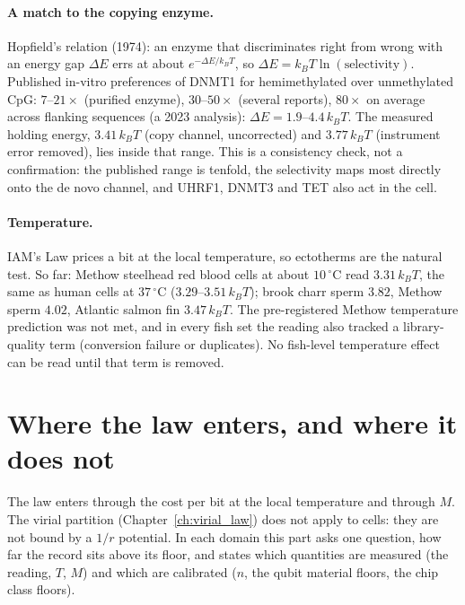 \paragraph{A match to the copying enzyme.} Hopfield's relation (1974): an enzyme that discriminates right from wrong with an energy gap $\Delta E$
errs at about $e^{-\Delta E/k_BT}$, so $\Delta E=k_BT\ln(\text{selectivity})$. Published in-vitro preferences of DNMT1 for hemimethylated over
unmethylated CpG: $7$--$21\times$ (purified enzyme), $30$--$50\times$ (several reports), $80\times$ on average across flanking sequences (a 2023
analysis): $\Delta E=1.9$--$4.4\,k_BT$. The measured holding energy, $3.41\,k_BT$ (copy channel, uncorrected) and $3.77\,k_BT$ (instrument error
removed), lies inside that range. This is a consistency check, not a confirmation: the published range is tenfold, the selectivity maps most
directly onto the de novo channel, and UHRF1, DNMT3 and TET also act in the cell.
\paragraph{Temperature.} IAM's Law prices a bit at the local temperature, so ectotherms are the natural test. So far: Methow steelhead red blood
cells at about $10\,^\circ$C read $3.31\,k_BT$, the same as human cells at $37\,^\circ$C ($3.29$--$3.51\,k_BT$); brook charr sperm $3.82$, Methow
sperm $4.02$, Atlantic salmon fin $3.47\,k_BT$. The pre-registered Methow temperature prediction was not met, and in every fish set the reading
also tracked a library-quality term (conversion failure or duplicates). No fish-level temperature effect can be read until that term is removed.

\section{Where the law enters, and where it does not}
The law enters through the cost per bit at the local temperature and through $M$. The virial partition (Chapter~\ref{ch:virial_law}) does not apply to
cells: they are not bound by a $1/r$ potential. In each domain this part asks one question, how far the record sits above its floor, and states
which quantities are measured (the reading, $T$, $M$) and which are calibrated ($n$, the qubit material floors, the chip class floors).
